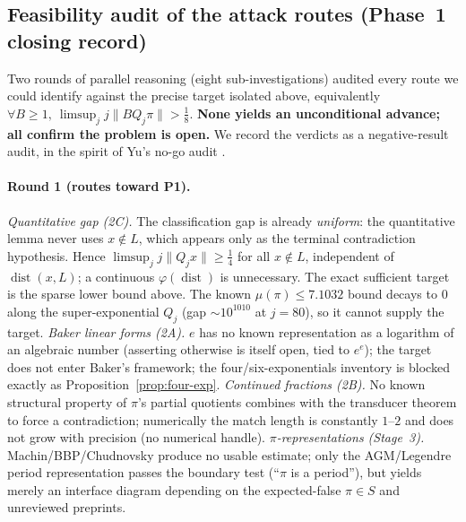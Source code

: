 \documentclass[11pt]{amsart}
\theoremstyle{definition}
\theoremstyle{remark}
\numberwithin{equation}{section}
\begin{document}
\subsection{Feasibility audit of the attack routes (Phase~1 closing record)}\label{sec:feasibility}

Two rounds of parallel reasoning (eight sub-investigations) audited every route we could identify against the precise target isolated above, equivalently $\forall B\ge1,\ \limsup_j j\|BQ_j\pi\|>\tfrac18$. \textbf{None yields an unconditional advance; all confirm the problem is open.} We record the verdicts as a negative-result audit, in the spirit of Yu's no-go audit \cite{Yu2026}.

\paragraph{Round 1 (routes toward P1).}
\emph{Quantitative gap (2C).} The classification gap is already \emph{uniform}: the quantitative lemma never uses $x\notin L$, which appears only as the terminal contradiction hypothesis. Hence $\limsup_j j\|Q_jx\|\ge\tfrac14$ for all $x\notin L$, independent of $\operatorname{dist}(x,L)$; a continuous $\varphi(\operatorname{dist})$ is unnecessary. The exact sufficient target is the sparse lower bound above. The known $\mu(\pi)\le7.1032$ bound decays to $0$ along the super-exponential $Q_j$ (gap $\sim10^{1010}$ at $j=80$), so it cannot supply the target. \emph{Baker linear forms (2A).} $e$ has no known representation as a logarithm of an algebraic number (asserting otherwise is itself open, tied to $e^e$); the target does not enter Baker's framework; the four/six-exponentials inventory is blocked exactly as Proposition~\ref{prop:four-exp}. \emph{Continued fractions (2B).} No known structural property of $\pi$'s partial quotients combines with the transducer theorem to force a contradiction; numerically the match length is constantly $1$--$2$ and does not grow with precision (no numerical handle). \emph{$\pi$-representations (Stage~3).} Machin/BBP/Chudnovsky produce no usable estimate; only the AGM/Legendre period representation passes the boundary test (``$\pi$ is a period''), but yields merely an interface diagram depending on the expected-false $\pi\in S$ and unreviewed preprints.
\end{document}
